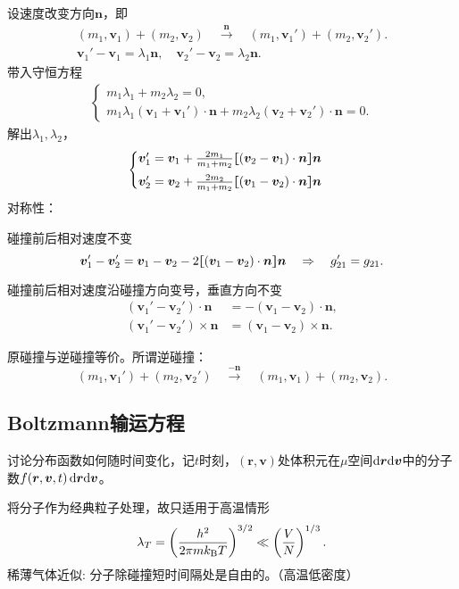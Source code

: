 设速度改变方向$\bm n$，即
\begin{gather*}
	(m_1,\bm v_1)+(m_2,\bm v_2)\quad\overset{\bm n}{\longrightarrow}\quad(m_1,\bm v_1')+(m_2,\bm v_2').\\
	\bm v_1'-\bm v_1=\lambda_1\bm n,\quad\bm v_2'-\bm v_2=\lambda_2\bm n.
\end{gather*}
带入守恒方程
\begin{align*}
	\begin{cases}
		m_1\lambda_1+m_2\lambda_2=0,\\
		m_1\lambda_1(\bm v_1+\bm v_1')\cdot\bm n+m_2\lambda_2(\bm v_2+\bm v_2')\cdot\bm n=0.
	\end{cases}
\end{align*}
解出$\lambda_1,\lambda_2$，
\begin{align}
	\begin{cases}
		\bm v_1'=\bm v_1+\frac{2m_1}{m_1+m_2}\lfloor\hspace{-4.7 pt}\lceil (\bm v_2-\bm v_1)\cdot\bm n\rceil\hspace{-4.7 pt}\rfloor\bm n\\[1ex]
		\bm v_2'=\bm v_2+\frac{2m_2}{m_1+m_2}\lfloor\hspace{-4.7 pt}\lceil (\bm v_1-\bm v_2)\cdot\bm n\rceil\hspace{-4.7 pt}\rfloor\bm n
	\end{cases}
\end{align}
对称性：
\begin{compactenum}
	\item 碰撞前后相对速度不变
	\[
		\bm v_1'-\bm v_2'=\bm v_1-\bm v_2-2\lfloor\hspace{-4.7 pt}\lceil (\bm v_1-\bm v_2)\cdot\bm n\rceil\hspace{-4.7 pt}\rfloor\bm n\quad\Rightarrow\quad g_{21}'=g_{21}.
	\]
	\item 碰撞前后相对速度沿碰撞方向变号，垂直方向不变
	\begin{align*}
		(\bm v_1'-\bm v_2')\cdot\bm n&=-(\bm v_1-\bm v_2)\cdot\bm n,\\
		(\bm v_1'-\bm v_2')\times\bm n&=(\bm v_1-\bm v_2)\times\bm n.
	\end{align*}
	\item 原碰撞与逆碰撞等价。所谓逆碰撞：
	\[
		(m_1,\bm v_1')+(m_2,\bm v_2')\quad\overset{-\bm n}{\longrightarrow}\quad(m_1,\bm v_1)+(m_2,\bm v_2).
	\]
\end{compactenum}
\subsection{Boltzmann输运方程}
讨论分布函数如何随时间变化，记$t$时刻，$(\bm r,\bm v)$处体积元在$\mu$空间$\mathop{}\!\mathrm{d}\bm r\mathrm{d}\bm v$中的分子数$f(\bm r,\bm v,t)\mathop{}\!\mathrm{d}\bm r\mathrm{d}\bm v$。

将分子作为经典粒子处理，故只适用于高温情形
\[
	\lambda_T=\left(\frac{h^2}{2\pi mk_{\mathrm B} T}\right)^{3/2}\ll\left(\frac VN\right)^{1/3}.
\]
稀薄气体近似: 分子除碰撞短时间隔处是自由的。（高温低密度）

